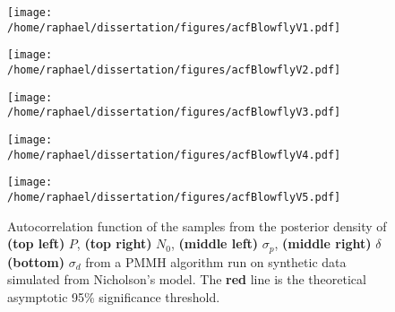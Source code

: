 \documentclass[12pt]{article}
\begin{document}
\begin{appendices}
	\begin{figure}[htb]
		\centering
		\begin{minipage}{0.49\textwidth}
			\centering
			\texttt{[image: /home/raphael/dissertation/figures/acfBlowflyV1.pdf]}
		\end{minipage}
		\begin{minipage}{0.49\textwidth}
			\centering
			\texttt{[image: /home/raphael/dissertation/figures/acfBlowflyV2.pdf]}
		\end{minipage}
		\begin{minipage}{0.49\textwidth}
			\centering
			\texttt{[image: /home/raphael/dissertation/figures/acfBlowflyV3.pdf]}
		\end{minipage}
		\begin{minipage}{0.49\textwidth}
			\centering
			\texttt{[image: /home/raphael/dissertation/figures/acfBlowflyV4.pdf]}
		\end{minipage}
		\begin{minipage}{0.49\textwidth}
			\centering
			\texttt{[image: /home/raphael/dissertation/figures/acfBlowflyV5.pdf]}
		\end{minipage}
		\caption[Autocorrelation functions of the samples from a PMMH algorithm run on synthetic data, Nicholson's model]{Autocorrelation function of the samples from the posterior density of \textbf{(top left)} $P$, \textbf{(top right)} $N_0$,  \textbf{(middle left)} $\sigma_p$,  \textbf{(middle right)} $\delta$ \textbf{(bottom)} $\sigma_d$ from a PMMH algorithm run on synthetic data simulated from Nicholson's model. The \textbf{red} line is the theoretical asymptotic 95\% significance threshold.}
		\label{fig:acfBlowfly}
	\end{figure}
	

\end{appendices}
\end{document}
